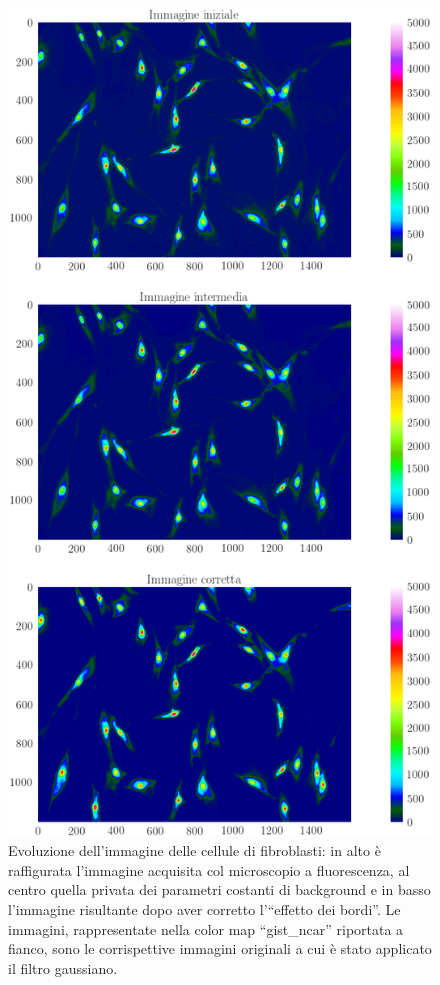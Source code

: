 \begin{figure}
 \centering
 \includegraphics[scale=.50]{img/CAP4cmap.png}
 \caption{\small{Evoluzione dell'immagine delle cellule di fibroblasti: in alto è raffigurata l'immagine acquisita col microscopio a fluorescenza, al centro quella privata dei parametri costanti di background e in basso l'immagine risultante dopo aver corretto l'``effetto dei bordi''. Le immagini, rappresentate nella color map ``gist\_ncar'' riportata a fianco, sono le corrispettive immagini originali a cui è stato applicato il filtro gaussiano.}}
 \label{fig:cmap}
\end{figure}


